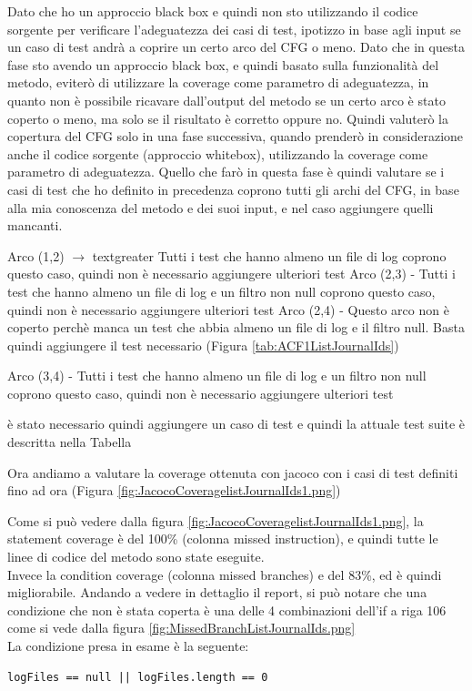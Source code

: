 \documentclass[12pt, a4paper]{article}
\begin{document}
Dato che ho un approccio black box e quindi non sto utilizzando il codice sorgente per verificare l'adeguatezza dei casi di test,
ipotizzo in base agli input se un caso di test andrà a coprire un certo arco del CFG o meno.
Dato che in questa fase sto avendo un approccio black box, e quindi basato sulla funzionalità del metodo, 
eviterò di utilizzare la coverage come parametro di adeguatezza, in quanto non è possibile ricavare
dall'output del metodo se un certo arco è stato coperto o meno, ma solo se il risultato è corretto oppure no.
Quindi valuterò la copertura del CFG solo in una fase successiva, quando prenderò in considerazione
anche il codice sorgente (approccio whitebox), utilizzando la coverage come parametro di adeguatezza.
Quello che farò in questa fase è quindi valutare se i casi di test che ho definito in precedenza
coprono tutti gli archi del CFG, in base alla mia conoscenza del metodo e dei suoi input, e nel caso
aggiungere quelli mancanti.

Arco (1,2)  $\rightarrow$ textgreater Tutti i test che hanno almeno un file di log coprono questo caso, quindi non è necessario aggiungere ulteriori test
Arco (2,3)  - \> Tutti i test che hanno almeno un file di log e un filtro non null coprono questo caso, quindi non è necessario aggiungere ulteriori test
Arco (2,4)  -\> 
Questo arco non è coperto perchè manca un test che abbia almeno un file di log e il filtro null. Basta quindi aggiungere il 
test necessario (Figura \ref{tab:ACF1ListJournalIds})


Arco (3,4)  -\> Tutti i test che hanno almeno un file di log e un filtro non null coprono questo caso, quindi non è necessario aggiungere ulteriori test


è stato necessario quindi aggiungere un caso di test e quindi la attuale test suite è descritta nella Tabella 


Ora andiamo a valutare la coverage ottenuta con jacoco con i casi di test definiti
fino ad ora (Figura \ref{fig:JacocoCoveragelistJournalIds1.png})

Come si può vedere dalla figura \ref{fig:JacocoCoveragelistJournalIds1.png},
la statement coverage è del 100\% (colonna missed instruction), 
e quindi tutte le linee di codice del metodo sono state eseguite. \\
Invece la condition coverage (colonna missed branches) e del 83\%, ed è quindi migliorabile.
Andando a vedere in dettaglio il report, si può notare che una condizione che non è stata coperta
è una delle 4 combinazioni dell'if a riga 106 come si vede dalla figura \ref{fig:MissedBranchListJournalIds.png}
\\
La condizione presa in esame è la seguente:
\begin{verbatim}
logFiles == null || logFiles.length == 0
\end{verbatim}
\end{document}
